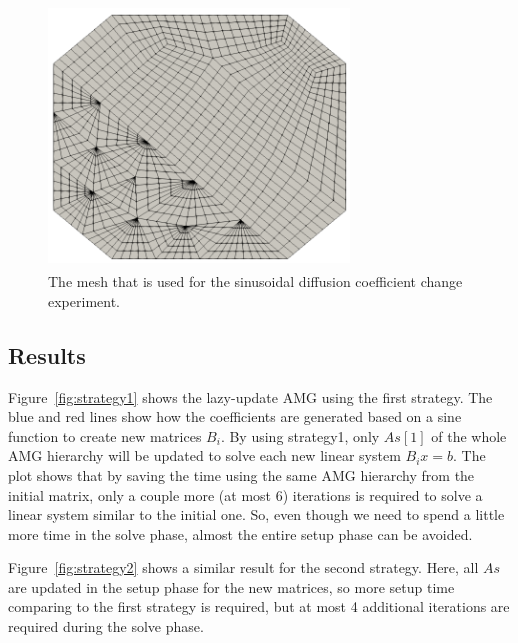 \begin{figure}[H]
 \centering
 \includegraphics[width=8cm,height=7cm]{./figures/mesh.png}
 \caption{The mesh that is used for the sinusoidal diffusion coefficient change experiment.}
 \label{fig:mesh}
\end{figure}

\subsection{Results}

Figure~\ref{fig:strategy1} shows the lazy-update AMG using the first strategy.
The blue and red lines show how the coefficients are generated based on a sine function to create new matrices $B_i$.
By using strategy1, only $As[1]$ of the whole AMG hierarchy will be updated to solve each new linear system $B_ix = b$.
The plot shows that by saving the time using the same AMG hierarchy from the initial matrix, only a couple more (at most 6)
iterations is required to solve a linear system similar to the initial one. So, even though we need to spend a little more
time in the solve phase, almost the entire setup phase can be avoided.

Figure~\ref{fig:strategy2} shows a similar result for the second strategy. Here, all $As$ are updated in the setup phase
for the new matrices, so more setup time comparing to the first strategy is required, but at most 4 additional iterations are required during the solve phase.

